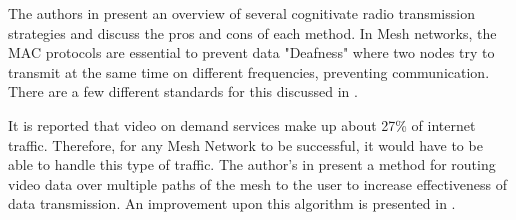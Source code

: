 The authors in \cite{5457862} present an overview of several cognitivate radio transmission strategies and discuss the pros and cons of each method. 
In Mesh networks, the MAC protocols are essential to prevent data "Deafness" where two nodes try to
transmit at the same time on different frequencies, preventing communication. There are a few 
different standards for this discussed in \cite{6392009}.

It is reported that video on demand services make up about 27\% of internet traffic. Therefore,
for any Mesh Network to be successful, it would have to be able to handle this type of traffic. The
author's in \cite{6112757} present a method for routing video data over multiple paths of the mesh
to the user to increase effectiveness of data transmission. An improvement upon this algorithm
is presented in \cite{6778761}. 

